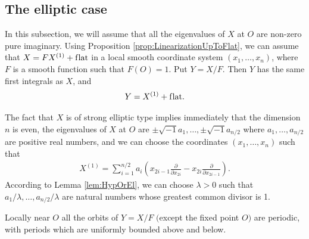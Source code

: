 \subsection{The elliptic case} In this subsection, we will assume that all the eigenvalues of $X$ at $O$
are non-zero pure imaginary. Using Proposition \ref{prop:LinearizationUpToFlat}, we can assume that
$X = FX^{(1)} + \text{f\/lat}$ in a local smooth coordinate system $(x_1,\dots,x_n)$, where $F$ is a smooth
function such that $F(O) =1$. Put $Y = X/F$. Then $Y$ has the same f\/irst integrals as $X$, and
\begin{gather*} %
 Y = X^{(1)} + \text{f\/lat}.
\end{gather*}

The fact that $X$ is of strong elliptic type implies immediately that the dimension $n$ is even, the eigenvalues of $X$
at $O$ are $\pm \sqrt{-1} a_1,\dots, \pm \sqrt{-1} a_{n/2}$ where $a_1, \dots, a_{n/2}$ are positive real numbers,
and we can choose the coordinates $(x_1,\dots,x_n)$ such that
\begin{gather} \label{eqn:LinearElliptic}
 X^{(1)} = \sum_{i=1}^{n/2} a_i \left(x_{2i-1} \frac{\partial}{\partial x_{2i}} - x_{2i} \frac{\partial}{\partial x_{2i-1}}\right).
\end{gather}
According to Lemma \ref{lem:HypOrEl}, we can choose $\lambda > 0$ such that $a_1/\lambda, \dots, a_{n/2}/ \lambda$
are natural numbers whose greatest common divisor is 1.

\begin{lem} \label{lem:AllPeriodic}
Locally near $O$ all the orbits of $Y = X/F$ $($except the fixed point $O)$ are periodic, with periods which
are uniformly bounded above and below.
\end{lem}

